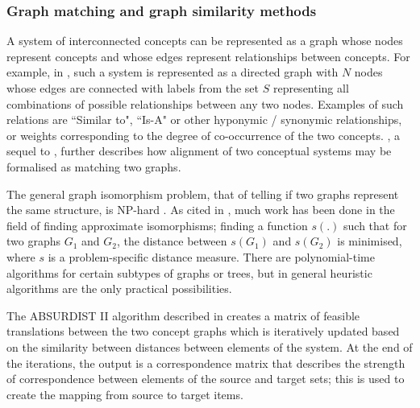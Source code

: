 


\subsubsection{Graph matching and graph similarity methods}

A system of interconnected concepts can be represented as a graph whose nodes represent concepts and whose edges represent relationships between concepts. For example, in \cite{Absurdist2}, such a system is represented as a directed graph with $N$ nodes whose edges are connected with labels from the set $S$ representing all combinations of possible relationships between any two nodes. Examples of such relations are ``Similar to", ``Is-A" or other hyponymic / synonymic relationships, or weights corresponding to the degree of co-occurrence of the two concepts. \cite{Absurdist2}, a sequel to \cite{GOLDSTONE2002295}, further describes how alignment of two conceptual systems may be formalised as matching two graphs.

The general graph isomorphism problem, that of telling if two graphs represent the same structure, is NP-hard \cite{GraphIsomorphismNPHard}. As cited in \cite{Absurdist2}, much work has been done in the field of finding approximate isomorphisms; finding a function $s(.)$ such that for two graphs $G_1$ and $G_2$, the distance between $s(G_1)$ and $s(G_2)$ is minimised, where $s$ is a problem-specific distance measure. There are polynomial-time algorithms for certain subtypes of graphs or trees, but in general heuristic algorithms are the only practical possibilities. 

The ABSURDIST II algorithm described in \cite{Absurdist2} creates a matrix of feasible translations between the two concept graphs which is iteratively updated based on the similarity between distances between elements of the system. At the end of the iterations, the output is a correspondence matrix that describes the strength of correspondence between elements of the source and target sets; this is used to create the mapping from source to target items. 

